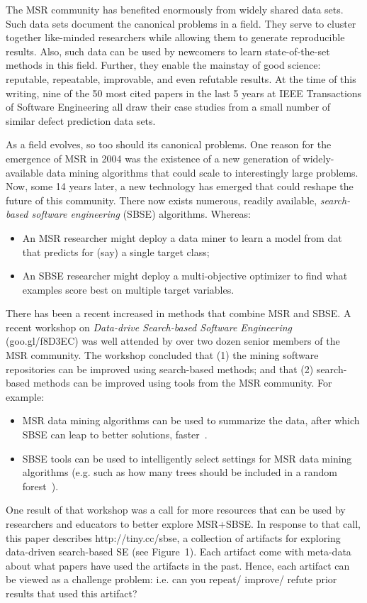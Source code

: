 \documentclass[table, xcdraw, sigconf,review, anonymous]{acmart}
\begin{document}
The MSR  community has benefited enormously from widely shared data sets.  Such data sets document the canonical problems in a field.
They serve to cluster together like-minded researchers while  
  allowing   them to generate reproducible results. Also, such data can be used by
   newcomers to learn state-of-the-set methods in this field. Further, they enable the mainstay of good science:
reputable, repeatable,  improvable, and even refutable results.
At the time of this writing,   nine of the 50 most cited papers in the last 5 years at IEEE Transactions of Software Engineering all draw their case studies
from a small number of similar defect prediction data sets.


As a field evolves, so too should its canonical problems. One  reason for the emergence of   MSR  in 2004 was the existence of a new generation of widely-available data mining
algorithms that could scale to interestingly large problems.  Now, some 14 years later, a new technology has emerged that could reshape the future of this community. There now exists numerous, readily
available, {\em search-based software engineering} (SBSE) algorithms. Whereas:
\begin{itemize}
\item
An MSR researcher might deploy a
data miner to learn a model from  dat   that predicts for (say) a single target class;
\item
An SBSE researcher might deploy a multi-objective optimizer
to find what examples score best
on multiple target variables.
\end{itemize}

There has been a recent increased in methods that combine MSR and SBSE.
A recent workshop  on {\em Data-drive Search-based Software
Engineering} (goo.gl/f8D3EC)   was well attended by over two dozen senior members of the MSR community.
The workshop concluded that (1) the mining software repositories can be improved using search-based methods; and that (2) search-based methods can be improved using tools from the MSR community. 
For example:
\begin{itemize}
\item
MSR data mining algorithms can be used to summarize the data, after which SBSE can leap to better solutions, faster~\cite{krall2015gale}.
\item
SBSE tools can be used to intelligently select 
settings for MSR data mining algorithms (e.g.
such as how many trees should be included in a random
forest~\cite{fu2016tuning}).
\end{itemize}
One result of that workshop was a call for more resources that can be used by researchers and educators to better explore MSR+SBSE.
In response to that call,  this paper describes http://tiny.cc/sbse,
a collection of artifacts for exploring
data-driven search-based SE (see Figure~1). 
 Each artifact  come with meta-data about what papers have used the artifacts in the past. Hence, each artifact can be viewed as a challenge problem: i.e. can you repeat/ improve/ refute prior results that used this artifact?
 
\end{document}
